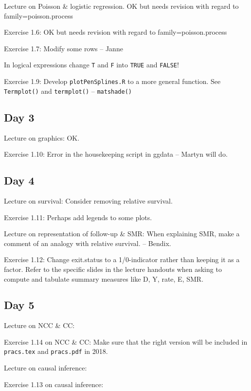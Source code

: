 Lecture on Poisson \& logistic regression. OK but needs revision with regard to family=poisson.process

Exercise 1.6: OK but needs revision with regard to family=poisson.process

Exercise 1.7: Modify some rows -- Janne

In logical expressions change {\tt T} and {\tt F} into {\tt TRUE} and {\tt FALSE}!

Exercise 1.9: Develop {\tt plotPenSplines.R} to a more general function.
See {\tt Termplot()} and {\tt termplot()} -- \texttt{matshade()}

\subsection*{Day 3}

Lecture on graphics: OK.

Exercise 1.10: Error in the housekeeping script in ggdata -- Martyn will do.

\subsection*{Day 4}

Lecture on survival: Consider removing relative survival.

Exercise 1.11: Perhaps add legends to some plots.  

Lecture on representation of follow-up \& SMR: When explaining SMR, make a comment
of an analogy with relative survival. -- Bendix. 

Exercise 1.12: Change exit.status to a 1/0-indicator rather than keeping it as a factor. Refer to the specific 
slides in the lecture handouts 
when asking to compute and tabulate summary measures like D, Y, rate, E, SMR.

\subsection*{Day 5}

Lecture on NCC \& CC: 

Exercise 1.14 on NCC \& CC: Make sure that the right version will be included in {\tt pracs.tex} and {\tt pracs.pdf} in 2018.

Lecture on causal inference:

Exercise 1.13 on causal inference:



